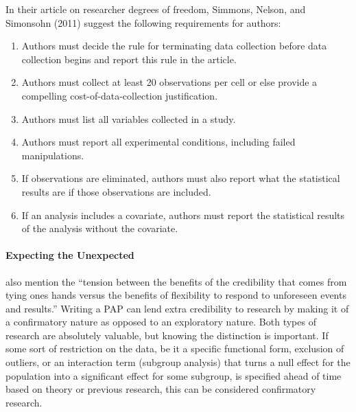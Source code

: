 \documentclass[12pt] {article}
\begin{document}
In their article on researcher degrees of freedom, Simmons, Nelson, and
Simonsohn (2011) suggest the following requirements for authors:

\begin{enumerate}
\def\labelenumi{\arabic{enumi}.}
\item
  Authors must decide the rule for terminating data collection before
  data collection begins and report this rule in the article.
\item
  Authors must collect at least 20 observations per cell or else provide
  a compelling cost-of-data-collection justification.
\item
  Authors must list all variables collected in a study.
\item
  Authors must report all experimental conditions, including failed
  manipulations.
\item
  If observations are eliminated, authors must also report what the
  statistical results are if those observations are included.
\item
  If an analysis includes a covariate, authors must report the
  statistical results of the analysis without the covariate.
\end{enumerate}

\paragraph{Expecting the Unexpected}
\cite{glennerster_running_2013} also mention the ``tension between
the benefits of the credibility that comes from tying ones hands versus
the benefits of flexibility to respond to unforeseen events and
results.'' Writing a PAP can lend extra credibility to research by making it of a confirmatory nature as opposed to an exploratory nature.
Both types of research are absolutely valuable, but knowing the distinction is important. If some sort of restriction on the data, be it a specific functional form, exclusion of outliers, or an interaction term (subgroup analysis) that turns a null effect for the population into a significant effect for some subgroup, is specified ahead of time based on theory or previous research, this can be considered confirmatory research. 
\end{document}
